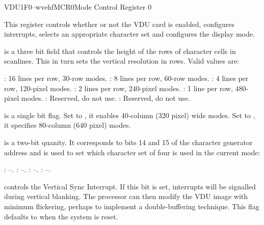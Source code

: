 \begin{ioport}{VDU}{1F0}{--wvehf}{MCR0}{Mode Control Register 0}

  This register controls whether or not the VDU card is enabled, configures
  interrupts, selects an appropriate character set and configures the display
  mode.

  \begin{cbitfield}
  \end{cbitfield}

  \begin{description}
     is a three bit field that controls the height of the rows
    of character cells in scanlines. This in turn sets the vertical resolution
    in rows. Valid values are:
    
    \begin{description}
      : 16 lines per row, 30-row modes.
      : 8 lines per row, 60-row modes.
      : 4 lines per row, 120-pixel modes.
      : 2 lines per row, 240-pixel modes.
      : 1 line per row, 480-pixel modes.
      : Reserved, do not use.
      : Reserved, do not use.
    \end{description}
    
     is a single bit flag. Set to , it enables
    40-column (320 pixel) wide modes. Set to , it specifies 80-column
    (640 pixel) modes.
    
     is a two-bit quanity. It corresponds to bits 14 and 15
    of the character generator address and is used to set which character set
    of four is used in the current mode:
    
    \begin{description}
      : –.
      : –.
      : –.
      : –.
    \end{description}
    
     controls the Vertical Sync Interrupt. If this bit is
    set, interrupts will be signalled during vertical blanking. The processor
    can then modify the VDU image with minimum flickering, perhaps to
    implement a double-buffering technique. This flag defaults to 
    when the system is reset.
    

\end{description}
\end{ioport}
